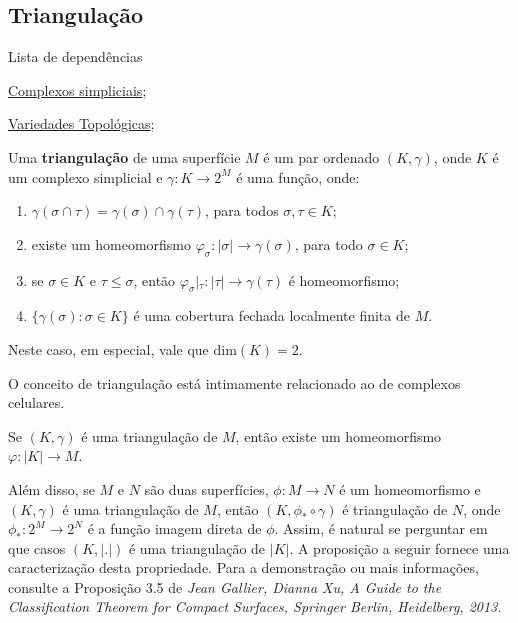 \subsection{Triangulação}
\label{triangulacao-def}
\begin{titlemize}{Lista de dependências}
	\item \hyperref[complexo-simplicial-def]{Complexos simpliciais};\\ %
	\item \hyperref[variedade-def]{Variedades Topológicas};\\
\end{titlemize}

\begin{defi}
    Uma \textbf{triangulação} de uma superfície $M$ é um par ordenado $(K,\gamma)$, onde $K$ é um complexo simplicial e $\gamma:K\to 2^M$ é uma função, onde:
    \begin{enumerate}
        \item $\gamma(\sigma \cap \tau) = \gamma(\sigma) \cap \gamma(\tau)$, para todos $\sigma, \tau \in K$;
        \item existe um homeomorfismo $\varphi_{\sigma}:|\sigma| \to \gamma(\sigma)$, para todo $\sigma \in K$;
        \item se $\sigma \in K$ e $\tau \leq \sigma$, então $\varphi_{\sigma}|_{\tau}: |\tau| \to \gamma(\tau)$ é homeomorfismo;
        \item $\{\gamma(\sigma): \sigma \in K\}$ é uma cobertura fechada localmente finita de $M$.
    \end{enumerate}
\end{defi}
Neste caso, em especial, vale que $\text{dim}(K) = 2$.

O conceito de triangulação está intimamente relacionado ao de complexos celulares.

\begin{prop}
    Se $(K,\gamma)$ é uma triangulação de $M$, então existe um homeomorfismo $\varphi: |K| \to M$.
\end{prop}

Além disso, se $M$ e $N$ são duas superfícies, $\phi:M\to N$ é um homeomorfismo e $(K,\gamma)$ é uma triangulação de $M$, então $(K,\phi_* \circ \gamma)$ é triangulação de $N$, onde $\phi_*: 2^M \to 2^N$ é a função imagem direta de $\phi$. Assim, é natural se perguntar em que casos $(K,|.|)$ é uma triangulação de $|K|$. A proposição a seguir fornece uma caracterização desta propriedade. Para a demonstração ou mais informações, consulte a Proposição 3.5 de \textit{Jean Gallier, Dianna Xu, A Guide to the Classification Theorem for Compact Surfaces, Springer Berlin, Heidelberg, 2013.} 

